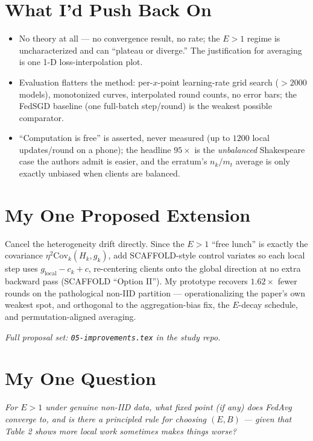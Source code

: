 \documentclass[10pt]{article}
\begin{document}
\section*{What I'd Push Back On}
\begin{itemize}
  \item No theory at all --- no convergence result, no rate; the $E>1$ regime is uncharacterized and can ``plateau or diverge.'' The justification for averaging is one 1-D loss-interpolation plot.
  \item Evaluation flatters the method: per-$x$-point learning-rate grid search ($>2000$ models), monotonized curves, interpolated round counts, no error bars; the FedSGD baseline (one full-batch step/round) is the weakest possible comparator.
  \item ``Computation is free'' is asserted, never measured (up to $1200$ local updates/round on a phone); the headline $95\times$ is the \emph{unbalanced} Shakespeare case the authors admit is easier, and the erratum's $n_k/m_t$ average is only exactly unbiased when clients are balanced.
\end{itemize}

\section*{My One Proposed Extension}
Cancel the heterogeneity drift directly. Since the $E>1$ ``free lunch'' is exactly the covariance $\eta^2\mathrm{Cov}_k(H_k,g_k)$, add SCAFFOLD-style control variates so each local step uses $g_{\mathrm{local}}-c_k+c$, re-centering clients onto the global direction at no extra backward pass (SCAFFOLD ``Option II''). My prototype recovers $1.62\times$ fewer rounds on the pathological non-IID partition --- operationalizing the paper's own weakest spot, and orthogonal to the aggregation-bias fix, the $E$-decay schedule, and permutation-aligned averaging.

\emph{Full proposal set: \texttt{05-improvements.tex} in the study repo.}

\section*{My One Question}
\emph{For $E>1$ under genuine non-IID data, what fixed point (if any) does FedAvg converge to, and is there a principled rule for choosing $(E,B)$ --- given that Table 2 shows more local work sometimes makes things \emph{worse}?}
\end{document}
